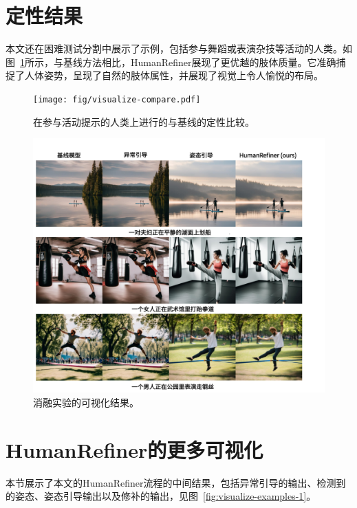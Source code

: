 \section{定性结果}
本文还在困难测试分割中展示了示例，包括参与舞蹈或表演杂技等活动的人类。如图~\ref{fig:visualize-compare}所示，与基线方法相比，HumanRefiner展现了更优越的肢体质量。它准确捕捉了人体姿势，呈现了自然的肢体属性，并展现了视觉上令人愉悦的布局。
\newpage

\begin{figure}[t]
    \centering
\texttt{[image: fig/visualize-compare.pdf]}
   \caption{在参与活动提示的人类上进行的与基线的定性比较。}
    \label{fig:visualize-compare}
    \vspace{-5mm}
\end{figure}

\begin{figure}[b]
    \centering
    \includegraphics[width=0.8\columnwidth]{fig/ablation_examples1.pdf}
    \caption{消融实验的可视化结果。}
    \label{fig:ablation_examples}
\end{figure}

\section{HumanRefiner的更多可视化}
本节展示了本文的HumanRefiner流程的中间结果，包括异常引导的输出、检测到的姿态、姿态引导输出以及修补的输出，见图~\ref{fig:visualize-examples-1}。



